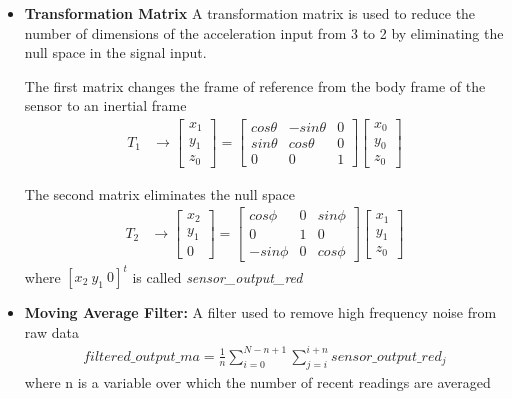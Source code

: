 \documentclass[a4paper, oneside,11pt]{article}
\begin{document}
\begin{itemize}

	\item \textbf{Transformation Matrix}
		A transformation matrix is used to reduce the number of dimensions of the acceleration input from 3 to 2 by eliminating the null space in the signal input.

		The first matrix changes the frame of reference from the body frame of the sensor to an inertial frame
		\begin{eqnarray}
		T_1 & \rightarrow
		  \begin{bmatrix}
			x_1\\
			y_1\\
			z_0
		  \end{bmatrix}
		  =
		  \left[
		  \begin{matrix}
			cos \theta & -sin \theta & 0\\
			sin \theta & cos \theta & 0\\
			0 & 0 & 1
		  \end{matrix}
		  \right]
		  \left[
		  \begin{matrix}
			x_0\\
			y_0\\
			z_0
		  \end{matrix}
		  \right]
		\end{eqnarray}

		The second matrix eliminates the null space
		\begin{eqnarray}
		T_2 & \rightarrow
		  \begin{bmatrix}
			x_2\\
			y_1\\
			0
		  \end{bmatrix}
		  =
		  \left[
		  \begin{matrix}
			cos \phi & 0 & sin \phi \\
			0 & 1 & 0\\
			-sin \phi & 0 & cos \phi
		  \end{matrix}
		  \right]
		  \left[
		  \begin{matrix}
			x_1\\
			y_1\\
			z_0
		  \end{matrix}
		  \right]
		\end{eqnarray}
		where \begin{math}\left[x_2\ y_1\ 0\right]^t\end{math} is called \textit{sensor\_output\_red}

	\item \textbf{Moving Average Filter:}
		A filter used to remove high frequency noise from raw data
		\begin{eqnarray}
		   filtered\_output\_ma = \frac{1}{n} \sum_{i=0}^{N - n + 1} \sum_{j=i}^{i+n} sensor\_output\_red_j
		\end{eqnarray}
		where n is a variable over which the number of recent readings are averaged


\end{itemize}
\end{document}
